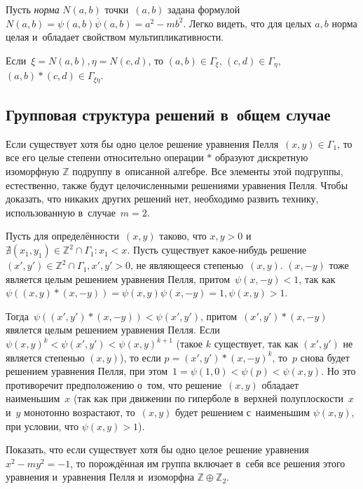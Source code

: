 \documentclass{article}
\begin{document}
\begin{definition}
  Пусть \emph{норма} $N(a, b)$ точки~$(a, b)$ задана
  формулой~$N(a, b) = \psi(a, b)\overline\psi(a, b) = a^2 - mb^2$.
  Легко видеть, что для целых $a, b$ норма целая и~обладает свойством
  мультипликативности.
\end{definition}

\begin{conclusion}
  Если~$\xi = N(a, b), \eta = N(c, d)$, то $(a, b) \in \Gamma_\xi$,
  $(c, d) \in \Gamma_\eta$, $(a, b) \ast (c, d) \in \Gamma_{\xi \eta}$.
\end{conclusion}

\subsection{Групповая структура решений в~общем случае}

Если существует хотя бы одно целое решение уравнения Пелля~$(x, y) \in
\Gamma_1$, то все его целые степени относительно операции $\ast$ образуют
дискретную изоморфную $\mathbb{Z}$ подруппу в~описанной алгебре. Все элементы
этой подгруппы, естественно, также будут целочисленными решениями уравнения
Пелля. Чтобы доказать, что никаких других решений нет, необходимо развить
технику, использованную в~случае~$m = 2$.

Пусть для определённости~$(x, y)$ таково, что $x, y > 0$ и~$\nexists (x_1, y_1)
\in \mathbb{Z}^2 \cap \Gamma_1 \colon x_1 < x$. Пусть существует какое-нибудь
решение~$(x',y') \in \mathbb{Z}^2 \cap \Gamma_1, x', y' > 0$, не являющееся
степенью~$(x, y)$. $(x, -y)$ тоже является целым решением уравнения
Пелля, притом~$\psi(x, -y) < 1$, так как~$\psi((x, y) \ast (x, -y)) =
\psi(x, y) \psi(x, -y) = 1, \psi(x, y) > 1$.

Тогда~$\psi((x', y') \ast (x, -y)) < \psi(x', y')$, притом~$(x', y') \ast
(x, -y)$ явялется целым решением уравнения Пелля. Если~$\psi(x, y)^k <
\psi(x', y') < \psi(x, y)^{k+1}$ (такое $k$ существует, так как $(x', y')$ не
является степенью $(x, y)$), то если $p = (x', y') \ast (x, -y)^{k}$, то~$p$
снова будет решением уравнения Пелля, при этом~$1 = \psi(1, 0) < \psi(p) <
\psi(x, y)$. Но это противоречит предположению о~том, что решение~$(x, y)$
обладает наименьшим~$x$ (так как при движении по гиперболе в~верхней
полуплоскости~$x$ и~$y$ монотонно возрастают, то~$(x, y)$ будет решением
с~наименьшим $\psi(x, y)$, при условии, что $\psi(x, y) > 1$).

\begin{exercise}
  Показать, что если существует хотя бы одно целое решение
  уравнения~$x^2 - my^2 = -1$, то порождённая им группа включает в~себя все
  решения этого уравнения и~уравнения Пелля и~изоморфна $\mathbb{Z} \oplus
  \mathbb{Z}_2$.
\end{exercise}
\end{document}
